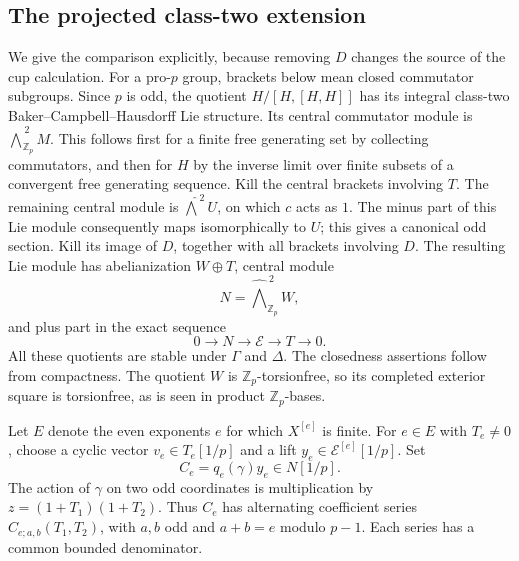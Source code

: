 \documentclass[11pt]{article}
\theoremstyle{definition}\newtheorem{definition}[theorem]{Definition}
\newcommand{\Z}{\mathbb Z}\newcommand{\Q}{\mathbb Q}
\begin{document}
\subsection{The projected class-two extension}

We give the comparison explicitly, because removing $D$ changes
the source of the cup calculation.
For a pro-$p$ group, brackets below mean closed commutator
subgroups. Since $p$ is odd, the quotient $H/[H,[H,H]]$
has its integral class-two Baker--Campbell--Hausdorff Lie
structure. Its central commutator module is
$\widehat{\bigwedge}^{\,2}_{\Z_p}M$. This follows first for a
finite free generating set by collecting commutators, and then
for $H$ by the inverse limit over finite subsets of a convergent
free generating sequence. Kill the central brackets involving
$T$. The remaining central module is
$\widehat{\bigwedge}^{\,2}U$, on which $c$ acts as $1$.
The minus part of this Lie module consequently maps
isomorphically to $U$; this gives a canonical odd section.
Kill its image of $D$, together with all brackets involving
$D$. The resulting Lie module has abelianization $W\oplus T$,
central module
\[
                   N=\widehat{\bigwedge}^{\,2}_{\Z_p}W,
\]
and plus part in the exact sequence
\begin{equation}
             0\longrightarrow N\longrightarrow \mathcal E
              \longrightarrow T\longrightarrow0 .
             \label{eq:projectedextension}
\end{equation}
All these quotients are stable under $\Gamma$ and $\Delta$.
The closedness assertions follow from compactness. The quotient
$W$ is $\Z_p$-torsionfree, so its completed exterior square
is torsionfree, as is seen in product $\Z_p$-bases.

Let $E$ denote the even exponents $e$ for which $X^{[e]}$
is finite. For $e\in E$ with $T_e\ne0$, choose a cyclic vector
$v_e\in T_e[1/p]$ and a lift $y_e\in\mathcal E^{[e]}[1/p]$.
Set
\begin{equation}
                C_e=q_e(\gamma)y_e\in N[1/p].
                \label{eq:projectedcompanion}
\end{equation}
The action of $\gamma$ on two odd coordinates is multiplication
by $z=(1+T_1)(1+T_2)$. Thus $C_e$ has alternating coefficient
series $C_{e;a,b}(T_1,T_2)$, with $a,b$ odd and
$a+b=e$ modulo $p-1$. Each series has a common bounded
denominator.
\end{document}

